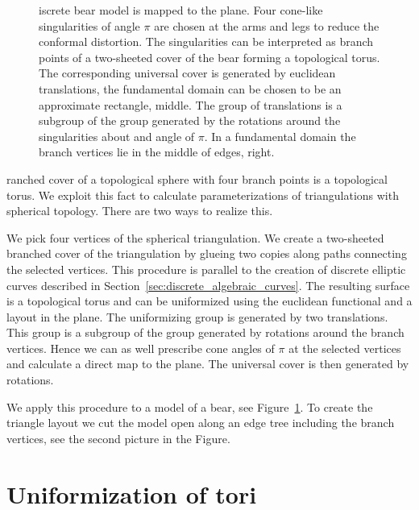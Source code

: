 \documentclass[Thesis.tex]{subfiles}
\begin{document}
\begin{figure}
\centering
{}
\caption{
iscrete bear model is mapped to the plane.
Four cone-like singularities of angle $\pi$ are chosen at the arms and legs to reduce the conformal distortion.
The singularities can be interpreted as branch points of a two-sheeted cover of the bear forming a topological torus.
The corresponding universal cover is generated by euclidean translations, the fundamental domain can be chosen to be an approximate rectangle, middle.
The group of translations is a subgroup of the group generated by the rotations around the singularities about and angle of $\pi$. In a fundamental domain the branch vertices lie in the middle of edges, right.
}
\label{fig:bear}
\end{figure}

ranched cover of a topological sphere with four branch points is a topological torus.
We exploit this fact to calculate parameterizations of triangulations with spherical topology.
There are two ways to realize this.

We pick four vertices of the spherical triangulation. We create a two-sheeted branched cover of the triangulation by glueing two copies along paths connecting the selected vertices.
This procedure is parallel to the creation of discrete elliptic curves described in Section~\ref{sec:discrete_algebraic_curves}.
The resulting surface is a topological torus and can be uniformized using the euclidean functional and a layout in the plane.
The uniformizing group is generated by two translations.
This group is a subgroup of the group generated by rotations around the branch vertices.
Hence we can as well prescribe cone angles of $\pi$ at the selected vertices and calculate a direct map to the plane.
The universal cover is then generated by rotations.

We apply this procedure to a model of a bear, see Figure~\ref{fig:bear}. To create the triangle layout we cut the model open along an edge tree including the branch vertices, see the second picture in the Figure.

\section{Uniformization of tori}
\label{sec:tori}
\end{document}
